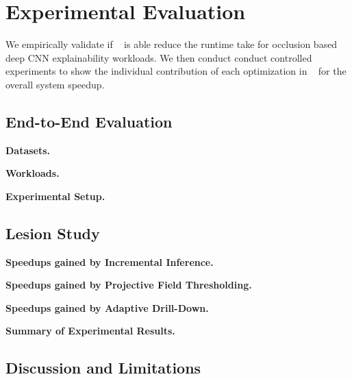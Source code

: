 \section{Experimental Evaluation}
We empirically validate if \system~ is able reduce the runtime take for occlusion based deep CNN explainability workloads.
We then conduct conduct controlled experiments to show the individual contribution of each optimization in \system~ for the overall system speedup.

\subsection{End-to-End Evaluation}

\vspace{2mm}
\noindent \textbf{Datasets.}

\vspace{2mm}
\noindent \textbf{Workloads.}

\vspace{2mm}
\noindent \textbf{Experimental Setup.}

\subsection{Lesion Study}

\vspace{2mm}
\noindent \textbf{Speedups gained by Incremental Inference.}

\vspace{2mm}
\noindent \textbf{Speedups gained by Projective Field Thresholding.}

\vspace{2mm}
\noindent \textbf{Speedups gained by Adaptive Drill-Down.}

\vspace{2mm}
\noindent \textbf{Summary of Experimental Results.}

\subsection{Discussion and Limitations}